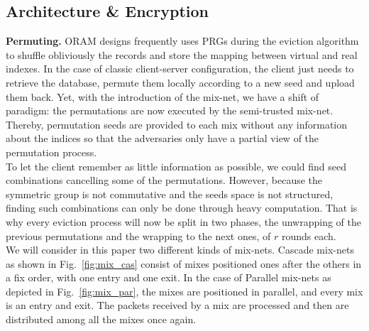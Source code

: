 \documentclass{llncs}
\begin{document}
\subsection{Architecture \& Encryption}\label{Arch}
%
\noindent\textbf{Permuting.} ORAM designs frequently uses PRGs during the eviction algorithm to shuffle obliviously the records and store the mapping between virtual and real indexes.
In the case of classic client-server configuration, the client just needs to retrieve the database, permute them locally according to a new seed and upload them back. Yet, with the introduction of the mix-net, we have a shift of paradigm: the permutations are now executed by the semi-trusted mix-net. Thereby, permutation seeds are provided to each mix without any information about the indices so that the adversaries only have a partial view of the permutation process.\\
To let the client remember as little information as possible, we could find seed combinations cancelling some of the permutations. However, because the symmetric group is not commutative and the seeds space is not structured, finding such combinations can only be done through heavy computation. That is why every eviction process will now be split in two phases, the unwrapping of the previous permutations and the wrapping to the next ones, of $r$ rounds each.\\
We will consider in this paper two different kinds of mix-nets. Cascade mix-nets as shown in Fig.~\ref{fig:mix_cas} consist of mixes positioned ones after the others in a fix order, with one entry and one exit. In the case of Parallel mix-nets as depicted in Fig.~\ref{fig:mix_par}, the mixes are positioned in parallel, and every mix is an entry and exit. The packets received by a mix are processed and then are distributed among all the mixes once again.\\
\end{document}
